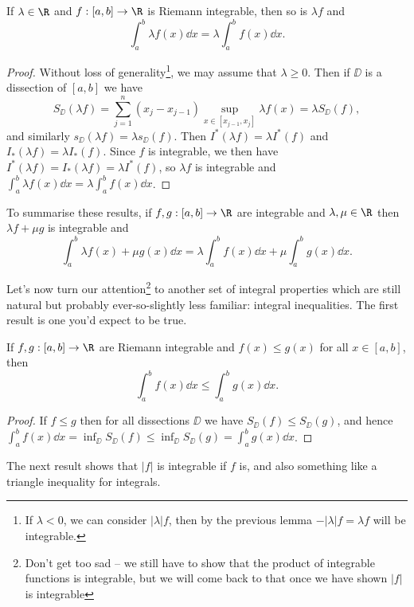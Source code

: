 \documentclass[a4paper]{scrartcl}
\begin{document}
\begin{proposition}
	If $\lambda \in \R$ and $f:[a, b] \rightarrow \R$ is Riemann integrable, then so is $\lambda f$ and 
	$$\int_a^b \lambda f(x) \dd x = \lambda \int_a^b f(x) \dd x.$$
\end{proposition}
\begin{proof}
	Without loss of generality\footnote{If $\lambda < 0$, we can consider $|\lambda| f$, then by the previous lemma $-|\lambda| f = \lambda f$ will be integrable.}, we may assume that $\lambda \geq 0$. Then if $\DD$ is a dissection of $[a, b]$ we have
	$$
	S_{\DD}(\lambda f) = \sum_{j = 1}^n (x_j - x_{j - 1})\sup_{x \in [x_{j - 1}, x_j]} \lambda f(x) = \lambda S_\DD(f),
	$$
	and similarly $s_{\DD}(\lambda f) = \lambda s_{\DD}(f)$. Then $I^*(\lambda f) = \lambda I^*(f)$ and $I_*(\lambda f) = \lambda I_*(f)$. Since $f$ is integrable, we then have $I^*(\lambda f) = I_*(\lambda f) = \lambda I^*(f)$, so $\lambda f$ is integrable and $\int_a^b \lambda f(x) \dd x = \lambda \int_a^b f(x) \dd x$.
\end{proof}

To summarise these results, if $f, g:[a, b] \rightarrow \R$ are integrable and $\lambda, \mu \in \R$ then $\lambda f + \mu g$ is integrable and
$$
	\int_a^b \lambda f(x) + \mu g(x) \dd x = \lambda \int_a^b f(x) \dd x + \mu \int_a^b g(x) \dd x.
$$

Let's now turn our attention\footnote{Don't get too sad -- we still have to show that the product of integrable functions is integrable, but we will come back to that once we have shown $|f|$ is integrable} to another set of integral properties which are still natural but probably ever-so-slightly less familiar: integral inequalities. The first result is one you'd expect to be true.

\begin{proposition}
	If $f, g:[a, b] \rightarrow \R$ are Riemann integrable and $f(x) \leq g(x)$ for all $x \in [a, b]$, then
	$$
	\int_a^b f(x) \dd x \leq \int_a^b g(x) \dd x.
	$$
\end{proposition}
\begin{proof}
	If $f \leq g$ then for all dissections $\DD$ we have $S_{\DD}(f) \leq S_{\DD}(g)$, and hence
	$
	\int_a^b f(x) \dd x = \inf_{\DD} S_{\DD}(f) \leq \inf_{\DD} S_{\DD}(g) = \int_{a}^b g(x) \dd x
	$.
\end{proof}

The next result shows that $|f|$ is integrable if $f$ is, and also 
something like a triangle inequality for integrals.
\end{document}
